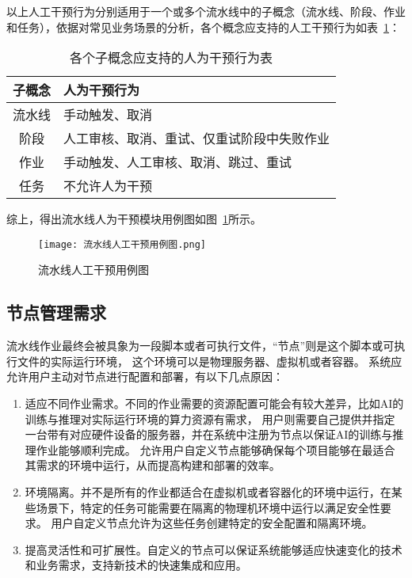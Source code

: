 以上人工干预行为分别适用于一个或多个流水线中的子概念（流水线、阶段、作业和任务），依据对常见业务场景的分析，各个概念应支持的人工干预行为如表~\ref{tab:各个子概念应支持的人为干预行为表}：
\begin{table}[h]
  \centering
  \caption{各个子概念应支持的人为干预行为表}
  \label{tab:各个子概念应支持的人为干预行为表}
  \begin{tabular}{cl}
    \toprule
    子概念     & 人为干预行为                                     \\ 
    \midrule
    流水线     & 手动触发、取消 \\
    阶段       & 人工审核、取消、重试、仅重试阶段中失败作业   \\
    作业       & 手动触发、人工审核、取消、跳过、重试      \\
    任务       & 不允许人为干预       \\
    \bottomrule
  \end{tabular}
\end{table}

综上，得出流水线人为干预模块用例图如图~\ref{fig:流水线人工干预用例图}所示。

\begin{figure}[h]
  \centering
  \texttt{[image: 流水线人工干预用例图.png]}
  \caption{流水线人工干预用例图}
  \label{fig:流水线人工干预用例图}
\end{figure}

\subsection{节点管理需求}
流水线作业最终会被具象为一段脚本或者可执行文件，“节点”则是这个脚本或可执行文件的实际运行环境，
这个环境可以是物理服务器、虚拟机或者容器。
系统应允许用户主动对节点进行配置和部署，有以下几点原因：
\begin{enumerate}
  \item 适应不同作业需求。不同的作业需要的资源配置可能会有较大差异，比如AI的训练与推理对实际运行环境的算力资源有需求，
  用户则需要自己提供并指定一台带有对应硬件设备的服务器，并在系统中注册为节点以保证AI的训练与推理作业能够顺利完成。
  允许用户自定义节点能够确保每个项目能够在最适合其需求的环境中运行，从而提高构建和部署的效率。
  \item 环境隔离。并不是所有的作业都适合在虚拟机或者容器化的环境中运行，在某些场景下，特定的任务可能需要在隔离的物理机环境中运行以满足安全性要求。
  用户自定义节点允许为这些任务创建特定的安全配置和隔离环境。
  \item 提高灵活性和可扩展性。自定义的节点可以保证系统能够适应快速变化的技术和业务需求，支持新技术的快速集成和应用。
\end{enumerate}

